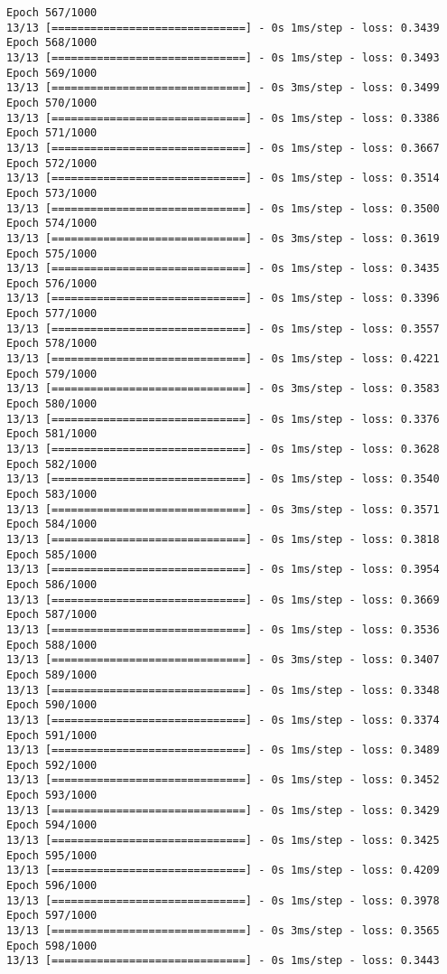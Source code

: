 \documentclass[11pt]{article}
\begin{document}
\begin{Verbatim}[commandchars=\\\{\}]
Epoch 567/1000
13/13 [==============================] - 0s 1ms/step - loss: 0.3439
Epoch 568/1000
13/13 [==============================] - 0s 1ms/step - loss: 0.3493
Epoch 569/1000
13/13 [==============================] - 0s 3ms/step - loss: 0.3499
Epoch 570/1000
13/13 [==============================] - 0s 1ms/step - loss: 0.3386
Epoch 571/1000
13/13 [==============================] - 0s 1ms/step - loss: 0.3667
Epoch 572/1000
13/13 [==============================] - 0s 1ms/step - loss: 0.3514
Epoch 573/1000
13/13 [==============================] - 0s 1ms/step - loss: 0.3500
Epoch 574/1000
13/13 [==============================] - 0s 3ms/step - loss: 0.3619
Epoch 575/1000
13/13 [==============================] - 0s 1ms/step - loss: 0.3435
Epoch 576/1000
13/13 [==============================] - 0s 1ms/step - loss: 0.3396
Epoch 577/1000
13/13 [==============================] - 0s 1ms/step - loss: 0.3557
Epoch 578/1000
13/13 [==============================] - 0s 1ms/step - loss: 0.4221
Epoch 579/1000
13/13 [==============================] - 0s 3ms/step - loss: 0.3583
Epoch 580/1000
13/13 [==============================] - 0s 1ms/step - loss: 0.3376
Epoch 581/1000
13/13 [==============================] - 0s 1ms/step - loss: 0.3628
Epoch 582/1000
13/13 [==============================] - 0s 1ms/step - loss: 0.3540
Epoch 583/1000
13/13 [==============================] - 0s 3ms/step - loss: 0.3571
Epoch 584/1000
13/13 [==============================] - 0s 1ms/step - loss: 0.3818
Epoch 585/1000
13/13 [==============================] - 0s 1ms/step - loss: 0.3954
Epoch 586/1000
13/13 [==============================] - 0s 1ms/step - loss: 0.3669
Epoch 587/1000
13/13 [==============================] - 0s 1ms/step - loss: 0.3536
Epoch 588/1000
13/13 [==============================] - 0s 3ms/step - loss: 0.3407
Epoch 589/1000
13/13 [==============================] - 0s 1ms/step - loss: 0.3348
Epoch 590/1000
13/13 [==============================] - 0s 1ms/step - loss: 0.3374
Epoch 591/1000
13/13 [==============================] - 0s 1ms/step - loss: 0.3489
Epoch 592/1000
13/13 [==============================] - 0s 1ms/step - loss: 0.3452
Epoch 593/1000
13/13 [==============================] - 0s 1ms/step - loss: 0.3429
Epoch 594/1000
13/13 [==============================] - 0s 1ms/step - loss: 0.3425
Epoch 595/1000
13/13 [==============================] - 0s 1ms/step - loss: 0.4209
Epoch 596/1000
13/13 [==============================] - 0s 1ms/step - loss: 0.3978
Epoch 597/1000
13/13 [==============================] - 0s 3ms/step - loss: 0.3565
Epoch 598/1000
13/13 [==============================] - 0s 1ms/step - loss: 0.3443

\end{Verbatim}
\end{document}
